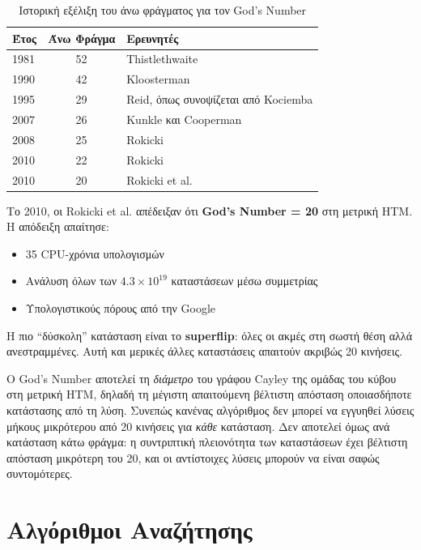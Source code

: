 \begin{table}[h]
\centering
\caption{Ιστορική εξέλιξη του άνω φράγματος για τον God's Number}
\label{tab:gods_number_history}
\begin{tabular}{lcl}
\toprule
\textbf{Έτος} & \textbf{Άνω Φράγμα} & \textbf{Ερευνητές} \\
\midrule
1981 & 52 & Thistlethwaite \cite{scherphuis_thistlethwaite_summary} \\
1990 & 42 & Kloosterman \cite{kloosterman1990} \\
1995 & 29 & Reid, όπως συνοψίζεται από Kociemba \cite{kociemba_moves20} \\
2007 & 26 & Kunkle και Cooperman \cite{kunkle2007twentysix} \\
2008 & 25 & Rokicki \cite{rokicki2008twentyfive} \\
2010 & 22 & Rokicki \cite{rokicki2010twentytwo} \\
2010 & 20 & Rokicki et al. \cite{rokicki2010gods,rokicki2014diameter} \\
\bottomrule
\end{tabular}
\end{table}

Το 2010, οι Rokicki et al. \cite{rokicki2010gods} απέδειξαν ότι \textbf{God's Number = 20} στη μετρική HTM. Η απόδειξη απαίτησε:
\begin{itemize}
    \item 35 CPU-χρόνια υπολογισμών
    \item Ανάλυση όλων των $4.3 \times 10^{19}$ καταστάσεων μέσω συμμετρίας
    \item Υπολογιστικούς πόρους από την Google
\end{itemize}

Η πιο ``δύσκολη'' κατάσταση είναι το \textbf{superflip}: όλες οι ακμές στη σωστή θέση αλλά ανεστραμμένες. Αυτή και μερικές άλλες καταστάσεις απαιτούν ακριβώς 20 κινήσεις.

Ο God's Number αποτελεί τη \emph{διάμετρο} του γράφου Cayley της ομάδας του κύβου στη μετρική HTM, δηλαδή τη μέγιστη απαιτούμενη βέλτιστη απόσταση οποιασδήποτε κατάστασης από τη λύση. Συνεπώς κανένας αλγόριθμος δεν μπορεί να εγγυηθεί λύσεις μήκους μικρότερου από 20 κινήσεις για \emph{κάθε} κατάσταση. Δεν αποτελεί όμως ανά κατάσταση κάτω φράγμα: η συντριπτική πλειονότητα των καταστάσεων έχει βέλτιστη απόσταση μικρότερη του 20, και οι αντίστοιχες λύσεις μπορούν να είναι σαφώς συντομότερες.


\section{Αλγόριθμοι Αναζήτησης}
\label{sec:bg_search}


